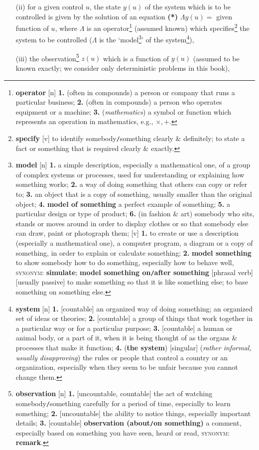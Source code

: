 \documentclass[oneside]{book}
\numberwithin{equation}{section}
\begin{document}
\begin{itemize}
	\item[(ii)] for a given control $u$, the state $y(u)$ of the system which is to be controlled is given by the solution of an equation \textbf{(*)} $\Lambda y(u) =$ given function of $u$, where $\Lambda$ is an operator\footnote{\textbf{operator} [n] \textbf{1.} (often in compounds) a person or company that runs a particular business; \textbf{2.} (often in compounds) a person who operates equipment or a machine; \textbf{3.} (\textit{mathematics}) a symbol or function which represents an operation in mathematics, e.g., $\times,+$.} (assumed known) which specifies\footnote{\textbf{specify} [v] to identify somebody\texttt{/}something clearly \& definitely; to state a fact or something that is required clearly \& exactly.} the system to be controlled ($\Lambda$ is the `model\footnote{\textbf{model} [n] \textbf{1.} a simple description, especially a mathematical one, of a group of complex systems or processes, used for understanding or explaining how something works; \textbf{2.} a way of doing something that others can copy or refer to; \textbf{3.} an object that is a copy of something, usually smaller than the original object; \textbf{4.} \textbf{model of something} a perfect example of something; \textbf{5.} a particular design or type of product; \textbf{6.} (in fashion \& art) somebody who sits, stands or moves around in order to  display clothes or so that somebody else can draw, paint or photograph them; [v] \textbf{1.} to create or use a description (especially a mathematical one), a computer program, a diagram or a copy of something, in order to explain or calculate something; \textbf{2.} \textbf{model something} to show somebody how to do something, especially how to behave well, \textsc{synonym}: \textbf{simulate}; \textbf{model something on\texttt{/}after something} [phrasal verb] [usually passive] to make something so that it is like something else; to base something on something else.}' of the system\footnote{\textbf{system} [n] \textbf{1.} [countable] an organized way of doing something; an organized set of ideas or theories; \textbf{2.} [countable] a group of things that work together in a particular way or for a particular purpose; \textbf{3.} [countable] a human or animal body, or a part of it, when it is being thought of as the organs \& processes that make it function; \textbf{4.} (\textbf{the system}) [singular] (\textit{rather informal, usually disapproving}) the rules or people that control a country or an organization, especially when they seem to be unfair because you cannot change them.}),
	\item[(iii)] the observation\footnote{\textbf{observation} [n] \textbf{1.} [uncountable, countable] the act of watching somebody\texttt{/}something carefully for a period of time, especially to learn something; \textbf{2.} [uncountable] the ability to notice things, especially important details; \textbf{3.} [countable] \textbf{observation (about\texttt{/}on something)} a comment, especially based on something you have seen, heard or read, \textsc{synonym}: \textbf{remark}.} $z(u)$ which is a function of $y(u)$ (assumed to be known exactly; we consider only deterministic problems in this book),

\end{itemize}
\end{document}
